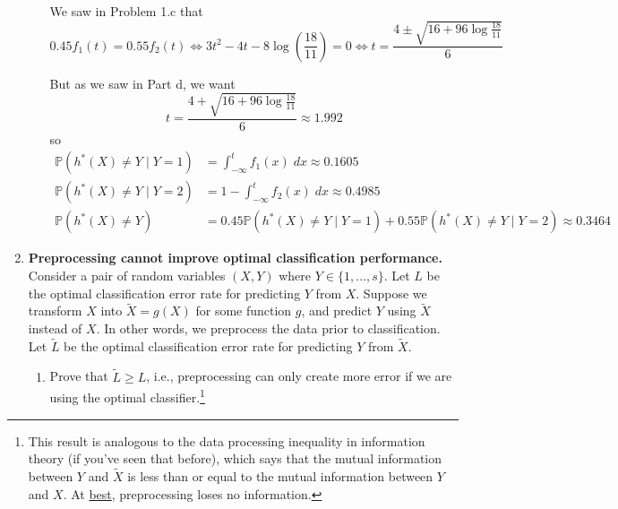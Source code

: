 \documentclass[11pt]{report}
\renewcommand{\P}{\mathbb{P}}
\begin{document}
\begin{enumerate}[1.]
\begin{enumerate}
		            We saw in Problem 1.c that
		            \[0.45 f_1(t) = 0.55f_2(t) \iff 3t^2 - 4t - 8\log(\frac{18}{11}) = 0 \iff t = \frac{4 \pm \sqrt{16 + 96\log \frac{18}{11}}}{6}\]

		            But as we saw in Part d, we want
		            \[t = \frac{4 + \sqrt{16 + 96\log \frac{18}{11}}}{6} \approx 1.992\]
		            so
		            \begin{align*}
			            \P(h^*(X) \neq Y \; | \; Y = 1) & =  \int_{-\infty}^t f_1(x)\; dx \approx \boxed{0.1605}                                               \\
			            \P(h^*(X) \neq Y \; | \; Y = 2) & =  1 - \int_{-\infty}^{t} f_2(x)\; dx \approx \boxed{0.4985}                                         \\
			            \P(h^*(X) \neq Y)               & = 0.45 \P(h^*(X) \neq Y \; | \; Y = 1) + 0.55 \P(h^*(X) \neq Y \; | \; Y = 2) \approx \boxed{0.3464}
		            \end{align*}
		            \color{black}
	      \end{enumerate}


	      \pagebreak

	\item {\bf Preprocessing cannot improve optimal classification performance.} Consider a pair of random variables $(X,Y)$ where $Y\in\{1,\dotsc,s\}$. Let $L$ be the optimal classification error rate for predicting $Y$ from $X$. Suppose we transform $X$ into $\tilde X=g(X)$ for some function $g$, and predict $Y$ using $\tilde X$ instead of $X$. In other words, we preprocess the data prior to classification. Let $\tilde L$ be the optimal classification error rate for predicting $Y$ from $\tilde X$.
	      \begin{enumerate}
		      \item Prove that $\tilde L \geq L$, i.e., preprocessing can only create more error if we are using the optimal
		            classifier.\footnote{This result is analogous to the data processing inequality in information theory (if you've seen that before), which says that the mutual information between $Y$ and $\tilde X$ is less than or equal to the mutual information between $Y$ and $X$. At \underline{best}, preprocessing loses no information.}


\end{enumerate}
\end{enumerate}
\end{document}
